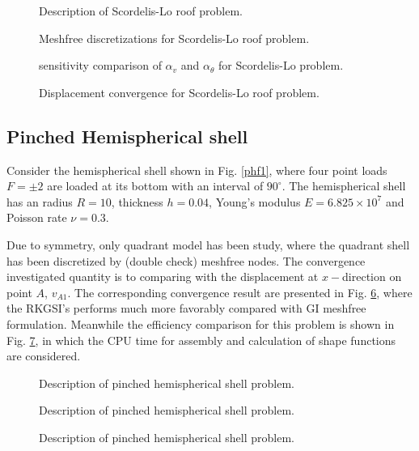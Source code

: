 \begin{figure}[!ht]
\centering
\caption{Description of Scordelis-Lo roof problem.}\label{slf1}
\end{figure}
\begin{figure}[!ht]
\centering
\caption{Meshfree discretizations for Scordelis-Lo roof problem.}\label{slf2}
\end{figure}
\begin{figure}[!ht]
\centering
\caption{sensitivity comparison of $\alpha_v$ and $\alpha_\theta$ for Scordelis-Lo problem.}\label{slf3}
\end{figure}
\begin{figure}[!ht]
\centering
\caption{Displacement convergence for Scordelis-Lo roof problem.}\label{slf4}
\end{figure}

\subsection{Pinched Hemispherical shell}
Consider the hemispherical shell shown in Fig. \ref{phf1}, where four point loads $F=\pm 2$ are loaded at its bottom with an interval of $90^\circ$. The hemispherical shell has an radius $R=10$, thickness $h=0.04$, Young's modulus $E=6.825\times10^7$ and Poisson rate $\nu = 0.3$.

Due to symmetry, only quadrant model has been study, where the quadrant shell has been discretized by (double check) meshfree nodes. The convergence investigated quantity is to comparing with the displacement at $x-$direction on point $A$, $v_{A1}$.
The corresponding convergence result are presented in Fig. \ref{slfc}, where the RKGSI's performs much more favorably compared with GI meshfree formulation. Meanwhile the efficiency comparison for this problem is shown in Fig. \ref{slfe}, in which the CPU time for assembly and calculation of shape functions are considered.
\begin{figure}[!ht]
\centering
\caption{Description of pinched hemispherical shell problem.}\label{slf1}
\end{figure}
\begin{figure}[!ht]
\centering
\caption{Description of pinched hemispherical shell problem.}\label{slfc}
\end{figure}
\begin{figure}[!ht]
\centering
\caption{Description of pinched hemispherical shell problem.}\label{slfe}
\end{figure}


